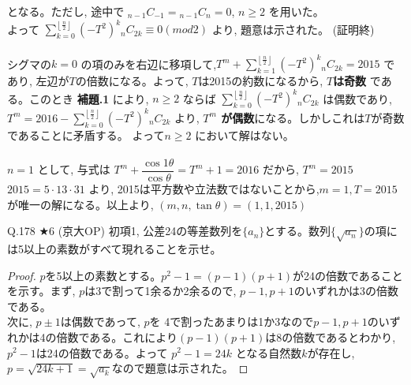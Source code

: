 \documentclass[twocolumn]{jsarticle}
\newcommand{\thm}{\begin{itembox}[l]}
\begin{document}
\begin{enumerate}
となる。ただし, 途中で ${}_{n-1}C_{-1}={}_{n-1}C_{n}=0$, $n\ge 2$ を用いた。\\
よって $\displaystyle\sum_{k=0}^{\left\lfloor\frac{n}{2}\right\rfloor} (-T^2)^k{}_nC_{2k}\equiv 0 (mod 2)$ より, 題意は示された。   (証明終)\\
\\
シグマの$k=0$ の項のみを右辺に移項して,$T^m+\displaystyle\sum_{k=1}^{\left\lfloor\frac{n}{2}\right\rfloor} (-T^2)^k{}_nC_{2k} =2015$ であり, 左辺が$T$の倍数になる。よって, $T$は2015の約数になるから, {\bf $T$は奇数} である。このとき {\bf 補題.1} により, $n\ge 2$ ならば $\displaystyle\sum_{k=0}^{\left\lfloor\frac{n}{2}\right\rfloor} (-T^2)^k{}_nC_{2k}$ は偶数であり,$T^m=2016-\displaystyle\sum_{k=0}^{\left\lfloor\frac{n}{2}\right\rfloor} (-T^2)^k{}_nC_{2k}$ より, {\bf $T^m$ が偶数}になる。しかしこれは$T$が奇数であることに矛盾する。 よって$n\ge 2$ において解はない。\\
\\
$n=1$ として, 与式は $T^m+\dfrac{\cos{1\theta}}{\cos{\theta}}=T^m+1=2016$ だから, $T^m=2015$\\
$2015=5\cdot 13\cdot 31$ より, 2015は平方数や立法数ではないことから,$m=1, T=2015$ が唯一の解になる。以上より, $(m,n,\tan{\theta})=(1,1,2015)$
\end{enumerate}



\thm{Q.178 $\bigstar 6$ (京大OP)}
初項1, 公差24の等差数列を$\{a_n\}$とする。数列$\{\sqrt{a_n}\}$の項には5以上の素数がすべて現れることを示せ。
\end{itembox}
\begin{proof}

$p$を5以上の素数とする。$p^2-1=(p-1)(p+1)$が24の倍数であることを示す。まず, $p$は3で割って1余るか2余るので, $p-1,p+1$のいずれかは3の倍数である。\\
次に, $p\pm 1$は偶数であって, $p$を
4で割ったあまりは1か3なので$p-1,p+1$のいずれかは4の倍数である。これにより$(p-1)(p+1)$は8の倍数であるとわかり, $p^2-1$は24の倍数である。よって $p^2-1=24k$  となる自然数$k$が存在し,  $p=\sqrt{24k+1}=\sqrt{a_k}$なので題意は示された。


\end{proof}
\end{document}
